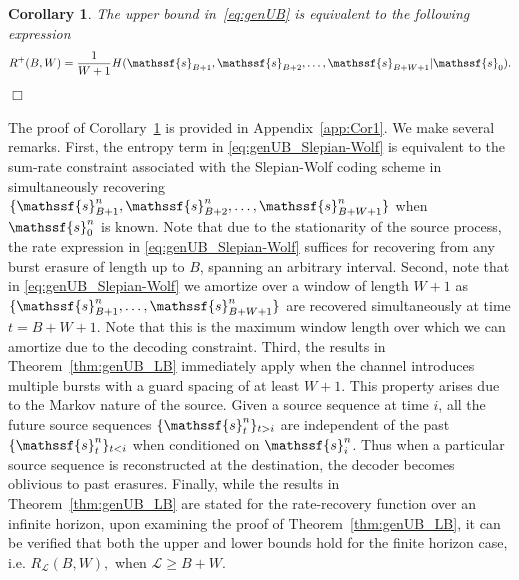 \documentclass[journal, twocolumn, 10pt]{IEEEtran}
\newtheorem{corol}{Corollary}
\newcommand{\cL}{{\mathcal{L}}}
\newcommand{\rvs}{{\mathssf{s}}}    %
\begin{document}
\begin{corol}
\label{corol:genUB}
The upper bound in~\eqref{eq:genUB} is equivalent to the following expression
\begin{align}
R^+(B,W) = \frac{1}{W+1} H(\rvs_{B+1}, \rvs_{B+2}, \ldots, \rvs_{B+W+1}|\rvs_{0}). \label{eq:genUB_Slepian-Wolf}
\end{align}\hfill$\Box$
\end{corol}
The proof of Corollary~\ref{corol:genUB} is provided in Appendix~\ref{app:Cor1}.  We make several remarks. First, the entropy term in \eqref{eq:genUB_Slepian-Wolf} is equivalent to the sum-rate constraint associated with the Slepian-Wolf  coding scheme in simultaneously recovering $\{\rvs^n_{B+1}, \rvs^n_{B+2}, \ldots, \rvs^n_{B+W+1}\}$ when $\rvs^n_{0}$ is known. Note that due to the stationarity of the source process, the rate expression in \eqref{eq:genUB_Slepian-Wolf} suffices for recovering from any burst erasure of length up to $B$, spanning an arbitrary interval. Second, note that in \eqref{eq:genUB_Slepian-Wolf} we amortize over a window of length $W+1$ as $\{\rvs_{B+1}^n, \ldots, \rvs_{B+W+1}^n\}$ are recovered simultaneously at time $t=B+W+1$. Note that this is the maximum window length over which we can amortize due to the decoding constraint. Third, the results in Theorem~\ref{thm:genUB_LB} immediately apply when the channel introduces multiple bursts with a guard spacing of at least $W+1$. This property arises due to the Markov nature of the source. Given a source sequence at time $i$, all the future source sequences $\{\rvs_t^n\}_{t > i}$ are independent of the past $\{\rvs_t^n\}_{t<i}$ when conditioned on $\rvs_i^n$. Thus when a particular source sequence is reconstructed at the destination, the decoder becomes oblivious to past erasures.  Finally, while the results in Theorem~\ref{thm:genUB_LB} are stated for the rate-recovery function over an infinite horizon, upon examining the proof of Theorem~\ref{thm:genUB_LB}, it can be verified that both the upper and lower bounds  hold for the finite horizon case, i.e. $R_{\mathcal L}(B, W),$ when $\cL \ge B+W$.
\end{document}
